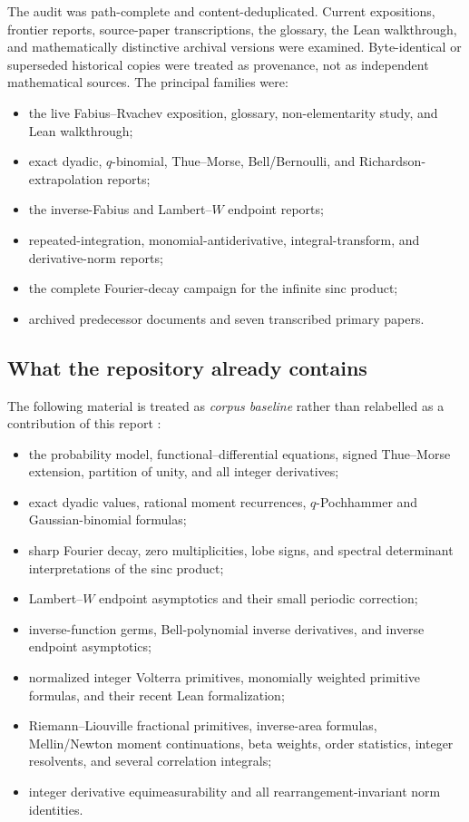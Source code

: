 \documentclass[11pt,oneside]{article}
\theoremstyle{definition}
\theoremstyle{remark}
\newcommand{\1}{\mathbf 1}
\begin{document}
The audit was path-complete and content-deduplicated.  Current expositions,
frontier reports, source-paper transcriptions, the glossary, the Lean
walkthrough, and mathematically distinctive archival versions were examined.
Byte-identical or superseded historical copies were treated as provenance,
not as independent mathematical sources.  The principal families were:
\begin{itemize}
\item the live Fabius--Rvachev exposition, glossary, non-elementarity study,
      and Lean walkthrough;
\item exact dyadic, $q$-binomial, Thue--Morse, Bell/Bernoulli, and
      Richardson-extrapolation reports;
\item the inverse-Fabius and Lambert--$W$ endpoint reports;
\item repeated-integration, monomial-antiderivative, integral-transform, and
      derivative-norm reports;
\item the complete Fourier-decay campaign for the infinite sinc product;
\item archived predecessor documents and seven transcribed primary papers.
\end{itemize}

\subsection{What the repository already contains}

The following material is treated as \emph{corpus baseline} rather than
relabelled as a contribution of this report
\cite{p9:ProveItPrimary,p9:ProveItAntiderivatives,p9:ProveItFourier}:
\begin{itemize}
\item the probability model, functional--differential equations, signed
      Thue--Morse extension, partition of unity, and all integer derivatives;
\item exact dyadic values, rational moment recurrences, $q$-Pochhammer and
      Gaussian-binomial formulas;
\item sharp Fourier decay, zero multiplicities, lobe signs, and spectral
      determinant interpretations of the sinc product;
\item Lambert--$W$ endpoint asymptotics and their small periodic correction;
\item inverse-function germs, Bell-polynomial inverse derivatives, and inverse
      endpoint asymptotics;
\item normalized integer Volterra primitives, monomially weighted primitive
      formulas, and their recent Lean formalization;
\item Riemann--Liouville fractional primitives, inverse-area formulas,
      Mellin/Newton moment continuations, beta weights, order statistics,
      integer resolvents, and several correlation integrals;
\item integer derivative equimeasurability and all rearrangement-invariant
      norm identities.
\end{itemize}
\end{document}
